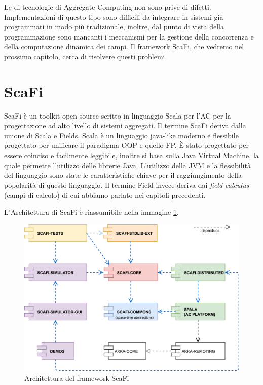 \documentclass[12pt,a4paper,openright,twoside]{book}
\begin{document}
Le di tecnologie di Aggregate Computing non sono prive di difetti. 
Implementazioni di questo tipo sono difficili da integrare in sistemi già programmati in modo più tradizionale, inoltre, dal punto di vista della programmazione sono mancanti i meccanismi per la gestione della concorrenza e della computazione dinamica dei campi. Il framework ScaFi, che vedremo nel prossimo capitolo, cerca di risolvere questi problemi.


\section{ScaFi}

ScaFi è un toolkit open-source scritto in linguaggio Scala per l'\ac{AC} per la progettazione ad alto livello di sistemi aggregati.
Il termine ScaFi deriva dalla unione di Scala e Fields. Scala è un linguaggio java-like moderno e flessibile progettato per unificare il paradigma \ac{OOP} e quello \ac{FP}. È stato progettato per essere coinciso e facilmente leggibile, inoltre si basa sulla Java Virtual Machine, la quale permette l'utilizzo delle librerie Java. L'utilizzo della JVM e la flessibilità del linguaggio sono state le caratteristiche chiave per il raggiungimento della popolarità di questo linguaggio. Il termine Field invece deriva dai \textit{field calculus} (campi di calcolo) di cui abbiamo parlato nei capitoli precedenti.

L'Architettura di ScaFi \cite{Casadei2022} è riassumibile nella immagine \cref{fig:scafi-arc}.

\begin{figure}
    \centering
    \includegraphics[width=.8\linewidth]{figures/scafi-arc.jpg}
    \caption{Architettura del framework ScaFi}
    \label{fig:scafi-arc}
\end{figure}
\end{document}
